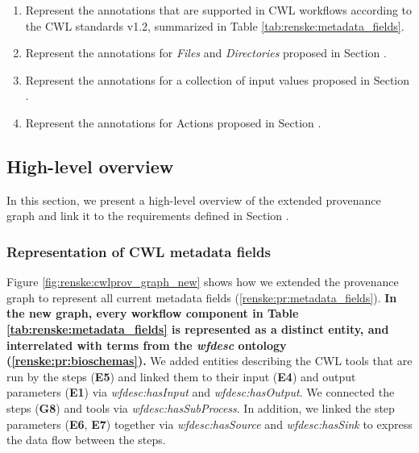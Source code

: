 \begin{enumerate}[label=\textbf{PR\arabic*}]
    \item \label{renske:pr:metadata_fields} Represent the annotations that are supported in CWL workflows according to the CWL standards v1.2, summarized in Table \ref{tab:renske:metadata_fields}.
    \item \label{renske:pr:input} Represent the annotations for \emph{Files} and \emph{Directories} proposed in Section \emph{}.
    \item \label{renske:pr:execution} Represent the annotations for a collection of input values proposed in Section \emph{}.
    \item \label{renske:pr:actions} Represent the annotations for Actions proposed in Section \emph{}.
\end{enumerate}

\subsection{High-level overview}
\label{sec:renske:ext_overview}
In this section, we present a high-level overview of the extended provenance graph and link it to the requirements defined in Section \emph{}.

\subsubsection{Representation of CWL metadata fields}



Figure \ref{fig:renske:cwlprov_graph_new} shows how we extended the provenance graph to represent all current metadata fields (\ref{renske:pr:metadata_fields}). \textbf{In the new graph, every workflow component in Table \ref{tab:renske:metadata_fields} is represented as a distinct entity, and interrelated with terms from the \emph{wfdesc} ontology (\ref{renske:pr:bioschemas}).} 
We added entities describing the CWL tools that are run by the steps (\textbf{E5}) and linked them to their input (\textbf{E4}) and output parameters (\textbf{E1}) via \emph{wfdesc:hasInput} and \emph{wfdesc:hasOutput}. We connected the steps (\textbf{G8}) and tools via \emph{wfdesc:hasSubProcess}. In addition, we linked the step parameters (\textbf{E6}, \textbf{E7}) together via \emph{wfdesc:hasSource} and \emph{wfdesc:hasSink} to express the data flow between the steps.

